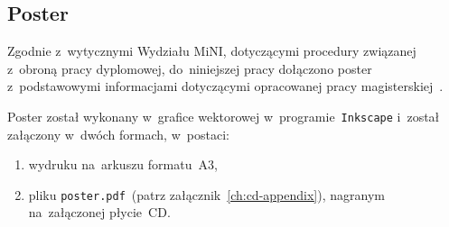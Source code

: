 \documentclass[thesis]{subfiles}
\begin{document}
\begin{appendices}

\chapter{Poster}

Zgodnie z~wytycznymi Wydziału MiNI, dotyczącymi procedury związanej z~obroną pracy dyplomowej, do~niniejszej pracy dołączono poster z~podstawowymi informacjami dotyczącymi opracowanej pracy magisterskiej~\cite{informacje-dot-obron}.

Poster został wykonany w~grafice wektorowej w~programie~\texttt{Inkscape} i~został załączony w~dwóch formach, w~postaci:
\begin{enumerate}
	\item wydruku na~arkuszu formatu~A3,
	\item pliku \mbox{\texttt{poster.pdf}}~(patrz załącznik~\ref{ch:cd-appendix}), nagranym na~załączonej płycie~CD.
\end{enumerate}

\vspace*{1.5em}
\centerline{\setlength{\fboxsep}{0pt}}


\end{appendices}
\end{document}
